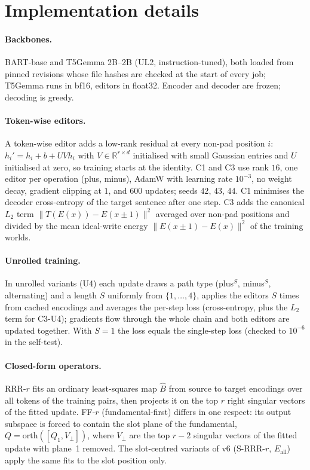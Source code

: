 \section{Implementation details}\label{app:implementation}
\paragraph{Backbones.}
BART-base and T5Gemma 2B--2B (UL2, instruction-tuned), both loaded from pinned revisions whose file hashes are checked at the start of
every job; T5Gemma runs in bf16, editors in float32. Encoder and decoder are frozen; decoding is greedy.

\paragraph{Token-wise editors.}
A token-wise editor adds a low-rank residual at every non-pad position $i$: $h_i' = h_i + b + UVh_i$ with $V \in \mathbb{R}^{r\times d}$
initialised with small Gaussian entries and $U$ initialised at zero, so training starts at the identity. C1 and C3 use rank $16$, one
editor per operation (plus, minus), AdamW with learning rate $10^{-3}$, no weight decay, gradient clipping at $1$, and $600$ updates;
seeds $42$, $43$, $44$. C1 minimises the decoder cross-entropy of the target sentence after one step. C3 adds the canonical $L_2$ term
$\lVert T(E(x)) - E(x\pm1)\rVert^2$ averaged over non-pad positions and divided by the mean ideal-write energy
$\lVert E(x\pm1) - E(x)\rVert^2$ of the training worlds.

\paragraph{Unrolled training.}
In unrolled variants (U4) each update draws a path type (plus$^S$, minus$^S$, alternating) and a length $S$ uniformly from
$\{1,\dots,4\}$, applies the editors $S$ times from cached encodings and averages the per-step loss (cross-entropy, plus the $L_2$ term
for C3-U4); gradients flow through the whole chain and both editors are updated together. With $S=1$ the loss equals the single-step loss
(checked to $10^{-6}$ in the self-test).

\paragraph{Closed-form operators.}
RRR-$r$ fits an ordinary least-squares map $\hat B$ from source to target encodings over all tokens of the training pairs, then projects
it on the top $r$ right singular vectors of the fitted update. FF-$r$ (fundamental-first) differs in one respect: its output subspace is
forced to contain the slot plane of the fundamental, $Q = \mathrm{orth}([Q_1, V_\perp])$, where $V_\perp$ are the top $r-2$ singular
vectors of the fitted update with plane~1 removed. The slot-centred variants of v6 (S-RRR-$r$, $E_{\mathrm{all}}$) apply the same fits to
the slot position only.

